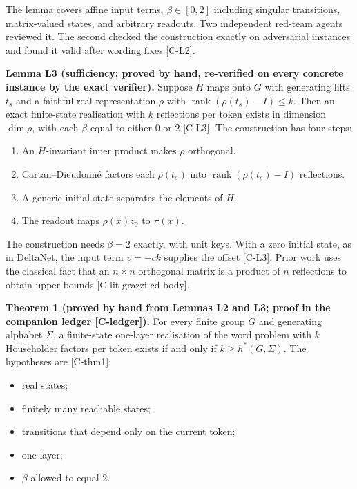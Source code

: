 \documentclass[10pt,twocolumn,a4paper]{article}
\providecommand{\tightlist}{\setlength{\itemsep}{0pt}\setlength{\parskip}{0pt}}
\begin{document}
The lemma covers affine input terms, \(\beta \in [0,2]\) including singular transitions, matrix-valued states, and arbitrary readouts. Two independent red-team agents reviewed it. The second checked the construction exactly on adversarial instances and found it valid after wording fixes {[}C-L2{]}.

\textbf{Lemma L3 (sufficiency; proved by hand, re-verified on every concrete instance by the exact verifier).} Suppose \(H\) maps onto \(G\) with generating lifts \(t_s\) and a faithful real representation \(\rho\) with \(\operatorname{rank}(\rho(t_s)-I) \le k\). Then an exact finite-state realisation with \(k\) reflections per token exists in dimension \(\dim\rho\), with each \(\beta\) equal to either \(0\) or \(2\) {[}C-L3{]}. The construction has four steps:

\begin{enumerate}
\def\labelenumi{\arabic{enumi}.}
\tightlist
\item
  An \(H\)-invariant inner product makes \(\rho\) orthogonal.
\item
  Cartan--Dieudonné factors each \(\rho(t_s)\) into \(\operatorname{rank}(\rho(t_s)-I)\) reflections.
\item
  A generic initial state separates the elements of \(H\).
\item
  The readout maps \(\rho(x) z_0\) to \(\pi(x)\).
\end{enumerate}

The construction needs \(\beta = 2\) exactly, with unit keys. With a zero initial state, as in DeltaNet, the input term \(v = -ck\) supplies the offset {[}C-L3{]}. Prior work uses the classical fact that an \(n\times n\) orthogonal matrix is a product of \(n\) reflections to obtain upper bounds {[}C-lit-grazzi-cd-body{]}.

\textbf{Theorem 1 (proved by hand from Lemmas L2 and L3; proof in the companion ledger {[}C-ledger{]}).} For every finite group \(G\) and generating alphabet \(\Sigma\), a finite-state one-layer realisation of the word problem with \(k\) Householder factors per token exists if and only if \(k \ge h^*(G,\Sigma)\). The hypotheses are {[}C-thm1{]}:

\begin{itemize}
\tightlist
\item
  real states;
\item
  finitely many reachable states;
\item
  transitions that depend only on the current token;
\item
  one layer;
\item
  \(\beta\) allowed to equal \(2\).
\end{itemize}
\end{document}

